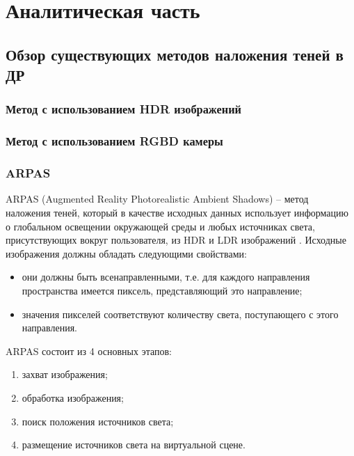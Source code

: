 \chapter{Аналитическая часть}


\section{Обзор существующих методов наложения теней в ДР}

\subsection{Метод с использованием HDR изображений}



\subsection{Метод с использованием RGBD камеры}



\subsection{ARPAS}

ARPAS (Augmented Reality Photorealistic Ambient Shadows) -- метод наложения теней, который в качестве исходных данных использует информацию о глобальном освещении окружающей среды и любых источниках света, присутствующих вокруг пользователя, из HDR и LDR изображений \cite{rtsm}. Исходные изображения должны обладать следующими свойствами:

\begin{itemize}
	\item они должны быть всенаправленными, т.е. для каждого направления пространства имеется пиксель, представляющий это направление;
	\item значения пикселей соответствуют количеству света, поступающего с этого направления.
\end{itemize}

ARPAS состоит из 4 основных этапов:

\begin{enumerate}
	\item захват изображения;
	\item обработка изображения;
	\item поиск положения источников света;
	\item размещение источников света на виртуальной сцене.
\end{enumerate}

